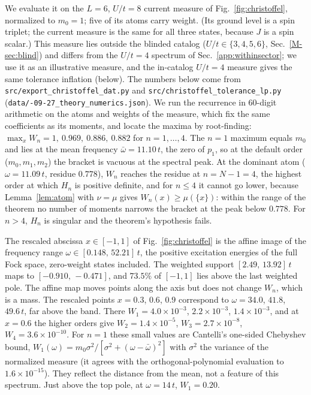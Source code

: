 \documentclass[aps,prb,onecolumn,superscriptaddress,longbibliography,floatfix]{revtex4-2}
\begin{document}
We evaluate it on the $L=6$, $U/t=8$ current measure of Fig.~\ref{fig:christoffel}, normalized to $m_0=1$; five of its atoms carry weight. (Its ground level is a spin triplet; the current measure is the same for all three states, because $J$ is a spin scalar.) This measure lies outside the blinded catalog ($U/t\in\{3,4,5,6\}$, Sec.~\ref{M-sec:blind}) and differs from the $U/t=4$ spectrum of Sec.~\ref{app:withinsector}; we use it as an illustrative measure, and the in-catalog $U/t=4$ measure gives the same tolerance inflation (below). The numbers below come from \texttt{src/\allowbreak export\_christoffel\_dat.py} and \texttt{src/\allowbreak christoffel\_tolerance\_lp.py} (\texttt{data/-09-27\_theory\_numerics.json}). We run the recurrence in $60$-digit arithmetic on the atoms and weights of the measure, which fix the same coefficients as its moments, and locate the maxima by root-finding: $\max_xW_n=1,\ 0.969,\ 0.886,\ 0.882$ for $n=1,\dots,4$. The $n=1$ maximum equals $m_0$ and lies at the mean frequency $\bar\omega=11.10\,t$, the zero of $p_1$, so at the default order ($m_0,m_1,m_2$) the bracket is vacuous at the spectral peak. At the dominant atom ($\omega=11.09\,t$, residue $0.778$), $W_n$ reaches the residue at $n=N-1=4$, the highest order at which $H_n$ is positive definite, and for $n\le4$ it cannot go lower, because Lemma~\ref{lem:atom} with $\nu=\mu$ gives $W_n(x)\ge\mu(\{x\})$: within the range of the theorem no number of moments narrows the bracket at the peak below $0.778$. For $n>4$, $H_n$ is singular and the theorem's hypothesis fails.

The rescaled abscissa $x\in[-1,1]$ of Fig.~\ref{fig:christoffel} is the affine image of the frequency range $\omega\in[0.148,\,52.21]\,t$, the positive excitation energies of the full Fock space, zero-weight states included. The weighted support $[2.49,\,13.92]\,t$ maps to $[-0.910,\,-0.471]$, and $73.5\%$ of $[-1,1]$ lies above the last weighted pole. The affine map moves points along the axis but does not change $W_n$, which is a mass. The rescaled points $x=0.3$, $0.6$, $0.9$ correspond to $\omega=34.0$, $41.8$, $49.6\,t$, far above the band. There $W_1=4.0\times10^{-3}$, $2.2\times10^{-3}$, $1.4\times10^{-3}$, and at $x=0.6$ the higher orders give $W_2=1.4\times10^{-5}$, $W_3=2.7\times10^{-8}$, $W_4=3.6\times10^{-10}$. For $n=1$ these small values are Cantelli's one-sided Chebyshev bound, $W_1(\omega)=m_0\sigma^2/[\sigma^2+(\omega-\bar\omega)^2]$ with $\sigma^2$ the variance of the normalized measure (it agrees with the orthogonal-polynomial evaluation to $1.6\times10^{-15}$). They reflect the distance from the mean, not a feature of this spectrum. Just above the top pole, at $\omega=14\,t$, $W_1=0.20$.
\end{document}
